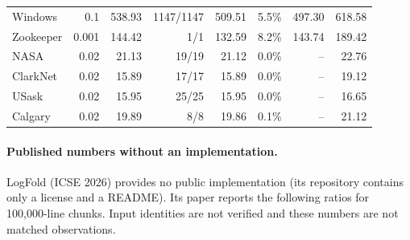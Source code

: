 \begin{longtable}{lrrrrrrr}
Windows & 0.1 & 538.93 & 1147/1147 & 509.51 & 5.5\% & 497.30 & 618.58 \\

Zookeeper & 0.001 & 144.42 & 1/1 & 132.59 & 8.2\% & 143.74 & 189.42 \\

NASA & 0.02 & 21.13 & 19/19 & 21.12 & 0.0\% & -- & 22.76 \\

ClarkNet & 0.02 & 15.89 & 17/17 & 15.89 & 0.0\% & -- & 19.12 \\

USask & 0.02 & 15.95 & 25/25 & 15.95 & 0.0\% & -- & 16.65 \\

Calgary & 0.02 & 19.89 & 8/8 & 19.86 & 0.1\% & -- & 21.12 \\

\bottomrule\end{longtable}

\paragraph{Published numbers without an implementation.} LogFold (ICSE 2026) provides no public implementation (its repository contains only a license and a README). Its paper reports the following ratios for 100,000-line chunks. Input identities are not verified and these numbers are not matched observations.

